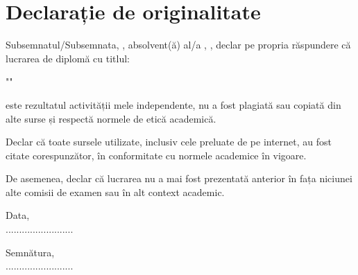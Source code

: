 \chapter*{Declarație de originalitate}

\vspace{0.5cm}

Subsemnatul/Subsemnata, \textbf{\detailauthor}, absolvent(ă) al/a \textbf{\detailuniversity}, \textbf{\detailfaculty}, declar pe propria răspundere că lucrarea de diplomă cu titlul:

\vspace{0.3cm}
\begin{center}
    "\textbf{\detailtitle}"
\end{center}
\vspace{0.3cm}

este rezultatul activității mele independente, nu a fost plagiată sau copiată din alte surse și respectă normele de etică academică.

\vspace{0.5cm}

Declar că toate sursele utilizate, inclusiv cele preluate de pe internet, au fost citate corespunzător, în conformitate cu normele academice în vigoare.

\vspace{0.5cm}

De asemenea, declar că lucrarea nu a mai fost prezentată anterior în fața niciunei alte comisii de examen sau în alt context academic.

\vspace{3cm}

\noindent
\begin{minipage}[t]{0.45\textwidth}
    Data,\\[1cm]
    .........................
\end{minipage}
\hfill
\begin{minipage}[t]{0.45\textwidth}
    \raggedleft
    Semnătura,\\[1cm]
    .........................
\end{minipage}
